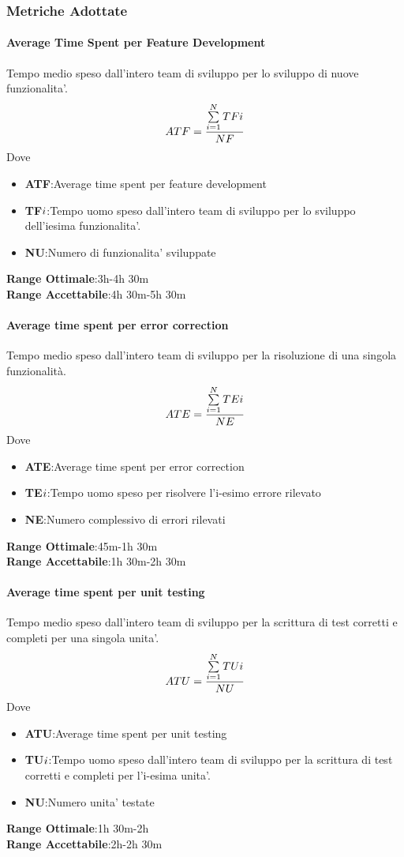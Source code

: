 \subsubsection{Metriche Adottate}
\paragraph{Average Time Spent per Feature Development}
\begin{flushleft}
Tempo medio speso dall'intero team di sviluppo per lo sviluppo di nuove funzionalita'.
	$$ATF=\frac{\sum\limits_{i=1}^N TF{\small{i}}}{NF}$$
Dove
\begin{itemize}
	\item{\textbf{ATF}}:Average time spent per feature development
	\item{\textbf{TF${\small{i}}$}}:Tempo uomo speso dall'intero team di sviluppo per lo sviluppo dell'iesima funzionalita'.
	\item{\textbf{NU}}:Numero di funzionalita' sviluppate
\end{itemize}
\textbf{Range Ottimale}:3h-4h 30m \\
\textbf{Range Accettabile}:4h 30m-5h 30m
\end{flushleft}
\paragraph{Average time spent per error correction}
\begin{flushleft}
Tempo medio speso dall'intero team di sviluppo per la risoluzione di una singola funzionalità.
	$$ATE=\frac{\sum\limits_{i=1}^N TE{\small{i}}}{NE}$$
Dove
\begin{itemize}
	\item{\textbf{ATE}}:Average time spent per error correction
	\item{\textbf{TE${\small{i}}$}}:Tempo uomo speso per risolvere l'i-esimo errore rilevato
	\item{\textbf{NE}}:Numero complessivo di errori rilevati
\end{itemize}
\textbf{Range Ottimale}:45m-1h 30m \\
\textbf{Range Accettabile}:1h 30m-2h 30m
\end{flushleft}
\paragraph{Average time spent per unit testing}
\begin{flushleft}
Tempo medio speso dall'intero team di sviluppo per la scrittura di test corretti e completi per una singola unita'.
	$$ATU=\frac{\sum\limits_{i=1}^N TU{\small{i}}}{NU}$$
Dove
\begin{itemize}
	\item{\textbf{ATU}}:Average time spent per unit testing
	\item{\textbf{TU${\small{i}}$}}:Tempo uomo speso dall'intero team di sviluppo per la scrittura di test corretti e completi per l'i-esima unita'.
	\item{\textbf{NU}}:Numero unita' testate
\end{itemize}
\textbf{Range Ottimale}:1h 30m-2h \\
\textbf{Range Accettabile}:2h-2h 30m
\end{flushleft}
